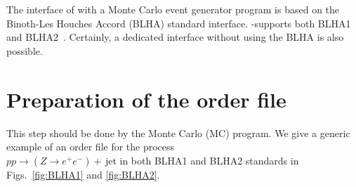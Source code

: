 The interface of \gosam{} with a Monte Carlo event generator program 
is based on the Binoth-Les Houches Accord (BLHA)
standard interface.
\gosam{}-\gosamversion supports both BLHA1~\cite{Binoth:2010xt}
and BLHA2~\cite{Alioli:2013nda}.
Certainly, a dedicated interface without using the BLHA is also possible.


\section{Preparation of the order file}
This step should be done by the Monte Carlo (MC) program. 
We give a generic example of an order file for the process \\
$pp\to (Z\to e^+e^-)+$\,jet in both BLHA1 and BLHA2 standards 
in Figs.~\ref{fig:BLHA1} and \ref{fig:BLHA2}.
\begin{figure}[htb!]
\begin{subfigure}[]{0.49\textwidth}
\centering
{}
\end{subfigure}
\begin{subfigure}[]{0.49\textwidth}
\centering
{}
\end{subfigure}
\end{figure}
